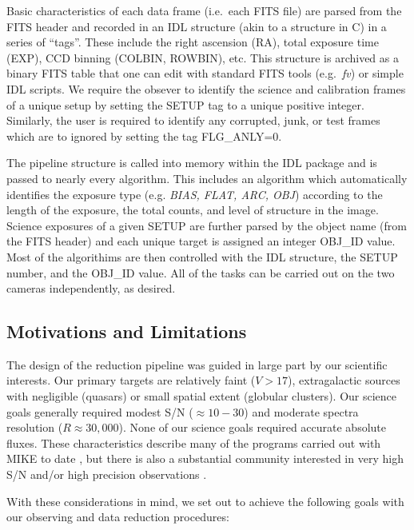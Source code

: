 \documentclass[12pt,preprint]{aastex}
\begin{document}
Basic characteristics of each data frame (i.e.\ each FITS file)
are parsed from the FITS header and recorded in an 
IDL structure (akin to a structure in C)
in a series of ``tags''.  These include the right ascension (RA),
total exposure time (EXP), CCD binning 
(COLBIN, ROWBIN), etc.  This structure is archived as a binary FITS table
that one can edit with standard FITS tools (e.g.\ {\it fv})
or simple IDL scripts.  We require the obsever to identify the
science and calibration frames of a unique setup by setting the SETUP tag 
to a unique positive integer.
Similarly, the user is required to identify any corrupted, junk,
or test frames which are to ignored by setting the tag FLG\_ANLY=0.

The pipeline structure is called into memory within the IDL package
and is passed to nearly every algorithm. 
This includes an algorithm which automatically identifies the 
exposure type (e.g. {\it BIAS, FLAT, ARC, OBJ}) according to the
length of the exposure, the total counts, and
level of structure in the image.
Science exposures of a given SETUP
are further parsed by the object name (from the FITS header) and 
each unique target is assigned an integer OBJ\_ID value. 
Most of the algorithims are then controlled with the
IDL structure, the SETUP number, and the OBJ\_ID value.
All of the tasks can be carried out on the two cameras
independently, as desired.

\subsection{Motivations and Limitations}

The design of the reduction pipeline was guided in large
part by our scientific interests.  Our primary targets are
relatively faint ($V>17$), extragalactic sources with negligible
(quasars) or small spatial extent (globular clusters).
Our science goals generally required modest S/N ($\approx 10-30$)
and moderate spectra resolution ($R\approx 30,000$). 
None of our science goals required accurate absolute fluxes.
These characteristics describe many of the programs carried
out with MIKE to date \citep[e.g.][]{cpb+05,mlk+07,dab+07},
but there is also a substantial community interested in very
high S/N and/or high precision observations
\citep[e.g.][]{butler}.

With these considerations in mind, we set out to achieve
the following goals with our observing and data reduction
procedures:
\end{document}
